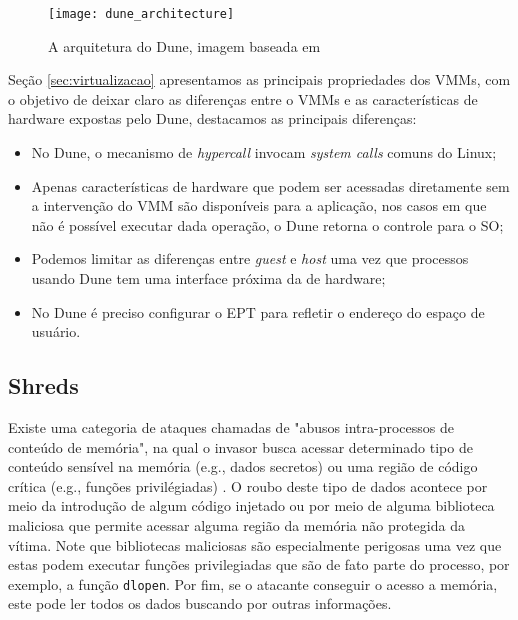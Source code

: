 \begin{figure}[!h]
  \centering
  \texttt{[image: dune\_architecture]} 
  \caption{A arquitetura do Dune, imagem baseada em \citep{belay}}
  \label{fig:dune_architecture}
\end{figure}

Seção \ref{sec:virtualizacao} apresentamos as principais propriedades dos VMMs,
com o objetivo de deixar claro as diferenças entre o VMMs e as características
de hardware expostas pelo Dune, destacamos as principais diferenças:

\begin{itemize}
  \item No Dune, o mecanismo de \textit{hypercall} invocam
        \textit{system calls} comuns do Linux;
  \item Apenas características de hardware que podem ser acessadas diretamente
        sem a intervenção do VMM são disponíveis para a aplicação, nos casos em
        que não é possível executar dada operação, o Dune retorna o controle
        para o SO;
  \item Podemos limitar as diferenças entre \textit{guest} e \textit{host} uma
        vez que processos usando Dune tem uma interface próxima da de hardware;
  \item No Dune é preciso configurar o EPT para refletir o endereço do espaço
        de usuário.
\end{itemize}

\subsection{Shreds}

Existe uma categoria de ataques chamadas de "abusos intra-processos de conteúdo
de memória", na qual o invasor busca acessar determinado tipo de conteúdo
sensível na memória (e.g., dados secretos) ou uma região de código crítica
(e.g., funções privilégiadas) \citep{shreds}. O roubo deste tipo de dados
acontece por meio da introdução de algum código injetado ou por meio de alguma
biblioteca maliciosa que permite acessar alguma região da memória não protegida
da vítima. Note que bibliotecas maliciosas são especialmente perigosas uma vez
que estas podem executar funções privilegiadas que são de fato parte do
processo, por exemplo, a função \texttt{dlopen}. Por fim, se o atacante
conseguir o acesso a memória, este pode ler todos os dados buscando por outras
informações.

